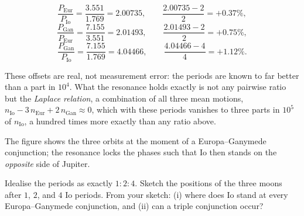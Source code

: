 \begin{solution}
\[
  \frac{P_{\mathrm{Eur}}}{P_{\mathrm{Io}}} = \frac{3.551}{1.769} = 2.00735,
  \qquad
  \frac{2.00735 - 2}{2} = +0.37\%,
\]
\[
  \frac{P_{\mathrm{Gan}}}{P_{\mathrm{Eur}}} = \frac{7.155}{3.551} = 2.01493,
  \qquad
  \frac{2.01493 - 2}{2} = +0.75\%,
\]
\[
  \frac{P_{\mathrm{Gan}}}{P_{\mathrm{Io}}} = \frac{7.155}{1.769} = 4.04466,
  \qquad
  \frac{4.04466 - 4}{4} = +1.12\%.
\]

These offsets are real, not measurement error: the periods are known to far better than a part in
$10^{4}$. What the resonance holds exactly is not any pairwise ratio but the \emph{Laplace
relation}, a combination of all three mean motions,
$n_{\mathrm{Io}} - 3\,n_{\mathrm{Eur}} + 2\,n_{\mathrm{Gan}} \approx 0$, which with these periods
vanishes to three parts in $10^{5}$ of $n_{\mathrm{Io}}$, a hundred times more exactly than any
ratio above.
\end{solution}

\parti The figure shows the three orbits at the moment of a Europa--Ganymede conjunction; the
resonance locks the phases such that Io then stands on the \emph{opposite} side of Jupiter.

\begin{center}
\end{center}

Idealise the periods as exactly $1:2:4$. Sketch the positions of the three moons after $1$, $2$,
and $4$ Io periods. From your sketch: (i) where does Io stand at every Europa--Ganymede
conjunction, and (ii) can a triple conjunction occur?

